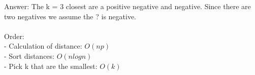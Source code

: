 Answer: The k = 3 closest are a positive negative and negative. Since there are two negatives we assume the ? is negative.\\\\
Order:\\
- Calculation of distance: $O(np)$ \\
- Sort distances: $O(n log n)$ \\
- Pick k that are the smallest: $O(k)$\\\\